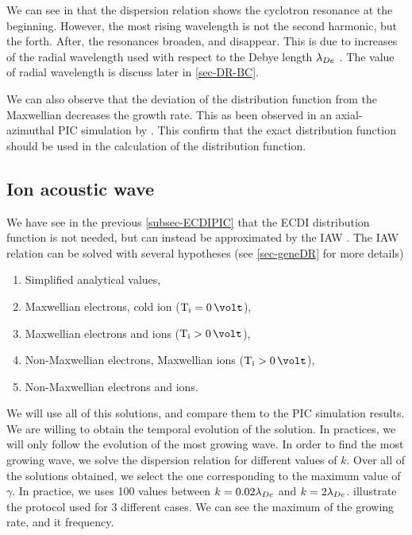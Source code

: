     We can see in  that the dispersion relation shows the cyclotron resonance at the beginning.
    However, the most rising wavelength is not the second harmonic, but the forth.
    After, the resonances broaden, and disappear.
    This is due to increases of the radial wavelength used with respect to the Debye length $\lambda_{De}$ \citet{lafleur2016a,ducrocq2006,cavalier2013}.
    The value of radial wavelength is discuss later in \cref{sec-DR-BC}.
    
    We can also observe that the deviation of the distribution function from the Maxwellian decreases the growth rate.
    This as been observed  in an axial-azimuthal \ac{PIC} simulation by \citet{lafleur2018}.
    This confirm that the exact distribution function should be used in the calculation of the distribution function.
    
  \subsection{Ion acoustic wave} \label{subsec-VDFIAW}
  
  We have see in the previous \cref{subsec-ECDIPIC} that the \ac{ECDI} distribution function is not needed, but can instead be approximated by the \ac{IAW} \citep{lafleur2018,janhunen2018,taccogna2019}.
  The \ac{IAW} relation can be solved with several hypotheses (see \cref{sec-geneDR} for more details)
  \begin{enumerate}
    \item Simplified analytical values,
    \item Maxwellian electrons, cold ion ($\Ti = 0\,\volt$),
    \item Maxwellian electrons and ions ($\Ti > 0\,\volt$),
    \item Non-Maxwellian electrons, Maxwellian ions ($\Ti > 0\,\volt$),
    \item Non-Maxwellian electrons and ions.
  \end{enumerate}
  
  We will use all of this solutions, and compare them to the \ac{PIC} simulation results.
  We are willing to obtain the temporal evolution of the solution.
  In practices, we will only follow the evolution of the most growing wave.
  In order to find the most growing wave, we solve the dispersion relation for different values of $k$.
  Over all of the solutions obtained, we select the one corresponding to the maximum value of $\gamma$.
  In practice, we uses 100 values between $k=0.02 \lambda_{De}$ and $k = 2 \lambda_{De}$.
   illustrate the protocol used for 3 different cases.
  We can see the maximum of the growing rate, and it frequency.
  
